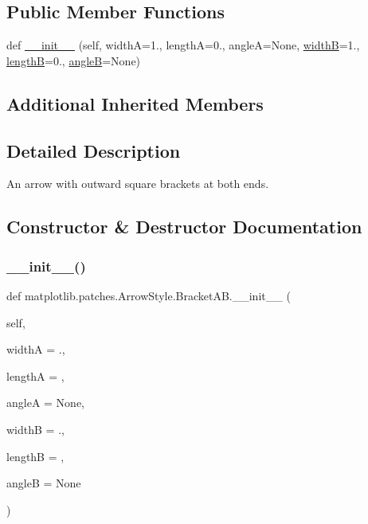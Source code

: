 \subsection*{Public Member Functions}
\begin{DoxyCompactItemize}
\item 
def \hyperlink{classmatplotlib_1_1patches_1_1ArrowStyle_1_1BracketAB_a43f54ed85d01f196be12e262632fa36d}{\+\_\+\+\_\+init\+\_\+\+\_\+} (self, widthA=1., lengthA=0., angleA=None, \hyperlink{classmatplotlib_1_1patches_1_1ArrowStyle_1_1__Bracket_a145f84316adeeaabbe60a5dea2281ddf}{widthB}=1., \hyperlink{classmatplotlib_1_1patches_1_1ArrowStyle_1_1__Bracket_a5fa143f40303b2b4cbcb4a24d233f735}{lengthB}=0., \hyperlink{classmatplotlib_1_1patches_1_1ArrowStyle_1_1__Bracket_ad57a9e23886fca6b0e6c632a509d947d}{angleB}=None)
\end{DoxyCompactItemize}
\subsection*{Additional Inherited Members}


\subsection{Detailed Description}
\begin{DoxyVerb}An arrow with outward square brackets at both ends.\end{DoxyVerb}
 

\subsection{Constructor \& Destructor Documentation}
\mbox{\label{classmatplotlib_1_1patches_1_1ArrowStyle_1_1BracketAB_a43f54ed85d01f196be12e262632fa36d}} 
\subsubsection{\texorpdfstring{\+\_\+\+\_\+init\+\_\+\+\_\+()}{\_\_init\_\_()}}
{\footnotesize\ttfamily def matplotlib.\+patches.\+Arrow\+Style.\+Bracket\+A\+B.\+\_\+\+\_\+init\+\_\+\+\_\+ (\begin{DoxyParamCaption}\item[{}]{self,  }\item[{}]{widthA = {.},  }\item[{}]{lengthA = {},  }\item[{}]{angleA = {\ttfamily None},  }\item[{}]{widthB = {.},  }\item[{}]{lengthB = {},  }\item[{}]{angleB = {\ttfamily None} }\end{DoxyParamCaption})}


